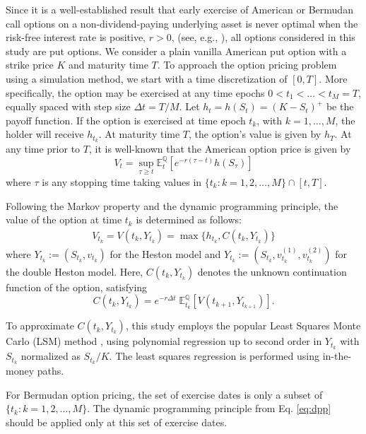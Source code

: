 \documentclass[]{interact}
\theoremstyle{plain}%
\theoremstyle{definition}
\theoremstyle{remark}
\begin{document}
Since it is a well-established result that early exercise of American or Bermudan call options on a non-dividend-paying underlying asset is never optimal when the risk-free interest rate is positive, $r>0$, (see, e.g., \cite{hull2016options}), all options considered in this study are put options. We consider a plain vanilla American put option with a strike price $ K $ and maturity time $ T $. To approach the option pricing problem using a simulation method, we start with a time discretization of $[0,T]$. More specifically, the option may be exercised at any time epochs $ 0 < t_1 < \ldots < t_M = T $, equally spaced with step size $\Delta t = T/M$. Let $ h_t = h (S_{t})= (K-S_t)^+$ be the payoff function. If the option is exercised at time epoch $ t_k $, with $ k=1, \ldots, M $, the holder will receive $ h_{t_k} $. At maturity time $ T $, the option's value is given by $ h_T $. At any time prior to $ T $, it is well-known that the American option price is given by
\begin{equation*}
   V_t =  \sup_{\tau \geq t} \mathbb{E}^{\mathbb{Q}}_t \left [e^{-r (\tau-t)} h (S_{\tau}) \right]
\end{equation*}
where $\tau$ is any stopping time taking values in $\{ t_k : k = 1, 2, \ldots, M \} \cap  [t, T]$.

Following the Markov property and the dynamic programming principle, the value of the option at time $ t_k $ is determined as follows:
\begin{align}\label{eq:dpp}
    V_{t_k} = V(t_k, Y_{t_k}) = \max \{h_{t_k}, C ( t_k,  Y_{t_k} )\}
\end{align}
where $ Y_{t_k} := (S_{t_k}, v_{t_k}) $ for the Heston model and $ Y_{t_k} := (S_{t_k}, v^{(1)}_{t_k}, v^{(2)}_{t_k}) $ for the double Heston model. Here, $ C ( t_k,  Y_{t_k} ) $ denotes the unknown continuation function of the option, satisfying
\begin{equation*}
C ( t_k,  Y_{t_k} ) = e^{-r \Delta t} \; \mathbb{E}^{\mathbb{Q}}_{t_k} [ V(t_{k+1},  Y_{t_{k+1}})].
\end{equation*}


To approximate $C(t_k, Y_{t_k})$, this study employs the popular Least Squares Monte Carlo (LSM) method \cite{longstaff2001valuing}, using polynomial regression up to second order in $Y_{t_k}$ with $S_{t_k}$ normalized as $S_{t_k}/K$. The least squares regression is performed using in-the-money paths.

For Bermudan option pricing, the set of exercise dates is only a subset of $\{ t_k : k = 1, 2, \ldots, M \}$. The dynamic programming principle from Eq. \eqref{eq:dpp} should be applied only at this set of exercise dates.
\end{document}
